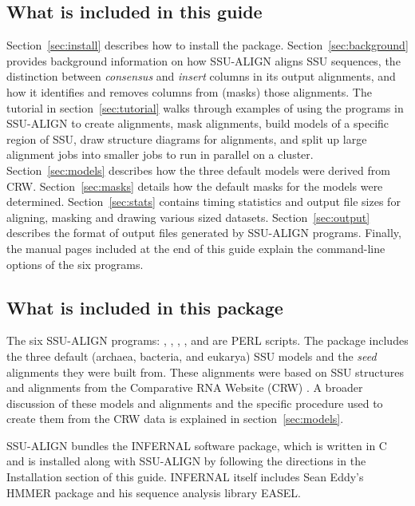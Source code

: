 \subsection{What is included in this guide}

Section~\ref{sec:install} describes how to install the
package. Section~\ref{sec:background} provides background information
on how SSU-ALIGN aligns SSU sequences, the distinction between
\emph{consensus} and \emph{insert} columns in its output alignments,
and how it identifies and removes columns from (masks) those
alignments.  The tutorial in section~\ref{sec:tutorial} walks through
examples of using the programs in SSU-ALIGN to create
alignments, mask alignments, build models of a specific region of SSU,
draw structure diagrams for alignments, and split up large alignment
jobs into smaller jobs to run in parallel on a cluster.
Section~\ref{sec:models} describes how the three default models were
derived from CRW. Section~\ref{sec:masks} details how the
default masks for the models were determined. 
Section~\ref{sec:stats} contains timing statistics and output file
sizes for aligning, masking and drawing various sized datasets.
Section~\ref{sec:output} describes the
format of output files generated by SSU-ALIGN programs.
Finally, the manual pages included at the end
of this guide explain the command-line options of the six programs.

\subsection{What is included in this package}

The six SSU-ALIGN programs: , ,
, ,  and 
are PERL scripts.  The package includes the three default (archaea,
bacteria, and eukarya) SSU models and the \emph{seed} alignments they
were built from. These alignments were based on SSU structures and
alignments from the Comparative RNA Website (CRW)
\cite{CannoneGutell02}. A broader discussion of these models and
alignments and the specific procedure used to create them from the CRW
data is explained in section~\ref{sec:models}.

SSU-ALIGN bundles the INFERNAL software package, which is
written in C and is installed along with SSU-ALIGN by following
the directions in the Installation section of this
guide. INFERNAL itself includes Sean Eddy's HMMER package
and his sequence analysis library EASEL.



